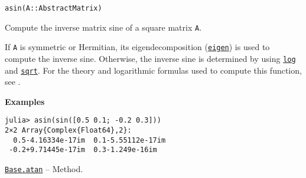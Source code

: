 \begin{adjustwidth}{2em}{0pt}


\begin{verbatim}
asin(A::AbstractMatrix)
\end{verbatim}

Compute the inverse matrix sine of a square matrix \texttt{A}.

If \texttt{A} is symmetric or Hermitian, its eigendecomposition (\hyperlink{11056016707394839114}{\texttt{eigen}}) is used to compute the inverse sine. Otherwise, the inverse sine is determined by using \hyperlink{17317607370922767936}{\texttt{log}} and \hyperlink{4551113327515323898}{\texttt{sqrt}}.  For the theory and logarithmic formulas used to compute this function, see \footnotemark[13].

\textbf{Examples}


\begin{verbatim}
julia> asin(sin([0.5 0.1; -0.2 0.3]))
2×2 Array{Complex{Float64},2}:
  0.5-4.16334e-17im  0.1-5.55112e-17im
 -0.2+9.71445e-17im  0.3-1.249e-16im
\end{verbatim}



\end{adjustwidth}
\hypertarget{16602871865924174581}{} 
\hyperlink{16602871865924174581}{\texttt{Base.atan}}  -- {Method.}

